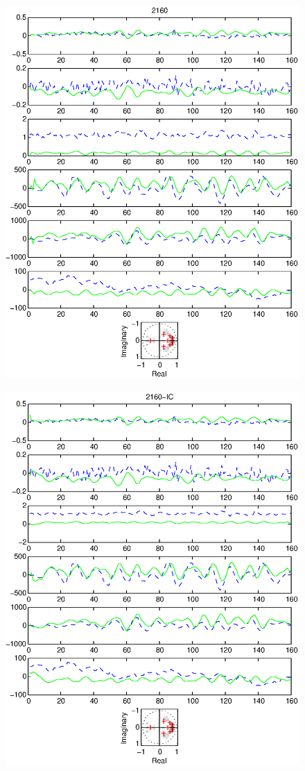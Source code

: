 \documentclass{article}
\begin{document}
\begin{figure}[htb!]\centering
\includegraphics{2160.eps}
\end{figure}\clearpage
\begin{figure}[htb!]\centering
\includegraphics{2160_ic.eps}
\end{figure}\clearpage
\end{document}
